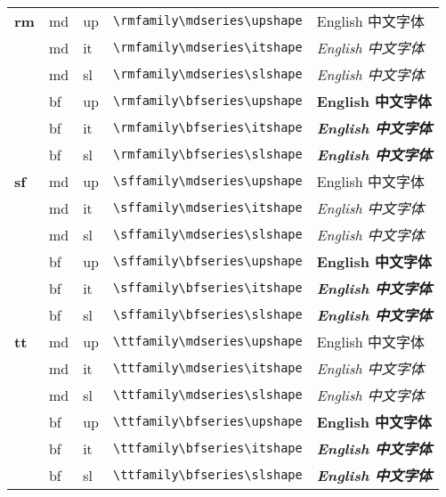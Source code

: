 \documentclass{article}
\begin{document}
\centering
\begin{tabular}{lllll}
\hline
 {\bf rm} & md & up & \verb|\rmfamily\mdseries\upshape| &
                      {\rmfamily\mdseries\upshape English 中文字体} \\
          & md & it & \verb|\rmfamily\mdseries\itshape| &
                      {\rmfamily\mdseries\itshape English 中文字体} \\
          & md & sl & \verb|\rmfamily\mdseries\slshape| &
                      {\rmfamily\mdseries\slshape English 中文字体} \\ \cline{2-5}
          & bf & up & \verb|\rmfamily\bfseries\upshape| &
                      {\rmfamily\bfseries\upshape English 中文字体} \\
          & bf & it & \verb|\rmfamily\bfseries\itshape| &
                      {\rmfamily\bfseries\itshape English 中文字体} \\
          & bf & sl & \verb|\rmfamily\bfseries\slshape| &
                      {\rmfamily\bfseries\slshape English 中文字体} \\ \hline
 {\bf sf} & md & up & \verb|\sffamily\mdseries\upshape| &
                      {\sffamily\mdseries\upshape English 中文字体} \\
          & md & it & \verb|\sffamily\mdseries\itshape| &
                      {\sffamily\mdseries\itshape English 中文字体} \\
          & md & sl & \verb|\sffamily\mdseries\slshape| &
                      {\sffamily\mdseries\slshape English 中文字体} \\ \cline{2-5}
          & bf & up & \verb|\sffamily\bfseries\upshape| &
                      {\sffamily\bfseries\upshape English 中文字体} \\
          & bf & it & \verb|\sffamily\bfseries\itshape| &
                      {\sffamily\bfseries\itshape English 中文字体} \\
          & bf & sl & \verb|\sffamily\bfseries\slshape| &
                      {\sffamily\bfseries\slshape English 中文字体} \\ \hline
 {\bf tt} & md & up & \verb|\ttfamily\mdseries\upshape| &
                      {\ttfamily\mdseries\upshape English 中文字体} \\
          & md & it & \verb|\ttfamily\mdseries\itshape| &
                      {\ttfamily\mdseries\itshape English 中文字体} \\
          & md & sl & \verb|\ttfamily\mdseries\slshape| &
                      {\ttfamily\mdseries\slshape English 中文字体} \\ \cline{2-5}
          & bf & up & \verb|\ttfamily\bfseries\upshape| &
                      {\ttfamily\bfseries\upshape English 中文字体} \\
          & bf & it & \verb|\ttfamily\bfseries\itshape| &
                      {\ttfamily\bfseries\itshape English 中文字体} \\
          & bf & sl & \verb|\ttfamily\bfseries\slshape| &
                      {\ttfamily\bfseries\slshape English 中文字体} \\ \hline
\end{tabular}
\end{document}
